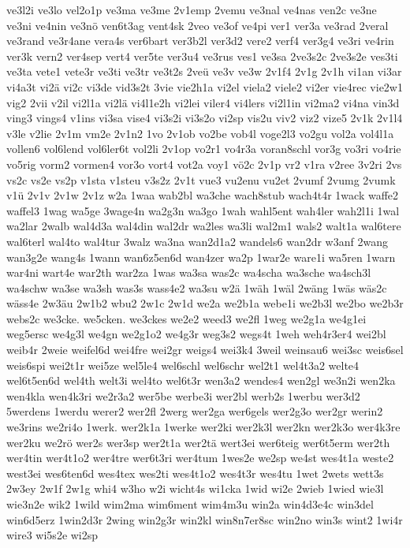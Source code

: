 {ve3l2i
ve3lo
vel2o1p
ve3ma
ve3me
2v1emp
2vemu
ve3nal
ve4nas
ven2c
ve3ne
ve3ni
ve4nin
ve3nö
ven6t3ag
vent4sk
2veo
ve3of
ve4pi
ver1
ver3a
ve3rad
2veral
ve3rand
ve3r4ane
vera4s
ver6bart
ver3b2l
ver3d2
vere2
verf4
ver3g4
ve3ri
ve4rin
ver3k
vern2
ver4sep
vert4
ver5te
ver3u4
ve3rus
ves1
ve3sa
2ve3s2c
2ve3s2e
ves3ti
ve3ta
vete1
vete3r
ve3ti
ve3tr
ve3t2s
2veü
ve3v
ve3w
2v1f4
2v1g
2v1h
vi1an
vi3ar
vi4a3t
vi2ä
vi2c
vi3de
vid3s2t
3vie
vie2h1a
vi2el
viela2
viele2
vi2er
vie4rec
vie2w1
vig2
2vii
v2il
vi2l1a
vi2lä
vi4l1e2h
vi2lei
viler4
vi4lers
vi2l1in
vi2ma2
vi4na
vin3d
ving3
vings4
v1ins
vi3sa
vise4
vi3s2i
vi3s2o
vi2sp
vis2u
viv2
viz2
vize5
2v1k
2v1l4
v3le
v2lie
2v1m
vm2e
2v1n2
1vo
2v1ob
vo2be
vob4l
voge2l3
vo2gu
vol2a
vol4l1a
vollen6
vol6lend
vol6ler6t
vol2li
2v1op
vo2r1
vo4r3a
voran8schl
vor3g
vo3ri
vo4rie
vo5rig
vorm2
vormen4
vor3o
vort4
vot2a
voy1
vö2c
2v1p
vr2
v1ra
v2ree
3v2ri
2vs
vs2c
vs2e
vs2p
v1sta
v1steu
v3s2z
2v1t
vue3
vu2enu
vu2et
2vumf
2vumg
2vumk
v1ü
2v1v
2v1w
2v1z
w2a
1waa
wab2bl
wa3che
wach8stub
wach4t4r
1wack
waffe2
waffel3
1wag
wa5ge
3wage4n
wa2g3n
wa3go
1wah
wahl5ent
wah4ler
wah2l1i
1wal
wa2lar
2walb
wal4d3a
wal4din
wal2dr
wa2les
wa3li
wal2m1
wals2
walt1a
wal6tere
wal6terl
wal4to
wal4tur
3walz
wa3na
wan2d1a2
wandels6
wan2dr
w3anf
2wang
wan3g2e
wang4s
1wann
wan6z5en6d
wan4zer
wa2p
1war2e
ware1i
wa5ren
1warn
war4ni
wart4e
war2th
war2za
1was
wa3sa
was2c
wa4scha
wa3sche
wa4sch3l
wa4schw
wa3se
wa3sh
was3s
wass4e2
wa3su
w2ä
1wäh
1wäl
2wäng
1wäs
wäs2c
wäss4e
2w3äu
2w1b2
wbu2
2w1c
2w1d
we2a
we2b1a
webe1i
we2b3l
we2bo
we2b3r
webs2c
we3cke.
we5cken.
we3ckes
we2e2
weed3
we2fl
1weg
we2g1a
we4g1ei
weg5ersc
we4g3l
we4gn
we2g1o2
we4g3r
weg3s2
wegs4t
1weh
weh4r3er4
wei2bl
weib4r
2weie
weifel6d
wei4fre
wei2gr
weigs4
wei3k4
3weil
weinsau6
wei3sc
weis6sel
weis6spi
wei2t1r
wei5ze
wel5le4
wel6schl
wel6schr
wel2t1
wel4t3a2
welte4
wel6t5en6d
wel4th
welt3i
wel4to
wel6t3r
wen3a2
wendes4
wen2gl
we3n2i
wen2ka
wen4kla
wen4k3ri
we2r3a2
wer5be
werbe3i
wer2bl
werb2s
1werbu
wer3d2
5werdens
1werdu
werer2
wer2fl
2werg
wer2ga
wer6gels
wer2g3o
wer2gr
werin2
we3rins
we2ri4o
1werk.
wer2k1a
1werke
wer2ki
wer2k3l
wer2kn
wer2k3o
wer4k3re
wer2ku
we2rö
wer2s
wer3sp
wer2t1a
wer2tä
wert3ei
wer6teig
wer6t5erm
wer2th
wer4tin
wer4t1o2
wer4tre
wer6t3ri
wer4tum
1wes2e
we2sp
we4st
wes4t1a
weste2
west3ei
wes6ten6d
wes4tex
wes2ti
wes4t1o2
wes4t3r
wes4tu
1wet
2wets
wett3s
2w3ey
2w1f
2w1g
whi4
w3ho
w2i
wicht4s
wi1cka
1wid
wi2e
2wieb
1wied
wie3l
wie3n2e
wik2
1wild
wim2ma
wim6ment
wim4m3u
win2a
win4d3e4c
win3del
win6d5erz
1win2d3r
2wing
win2g3r
win2kl
win8n7er8sc
win2no
win3s
wint2
1wi4r
wire3
wi5s2e
wi2sp
}
